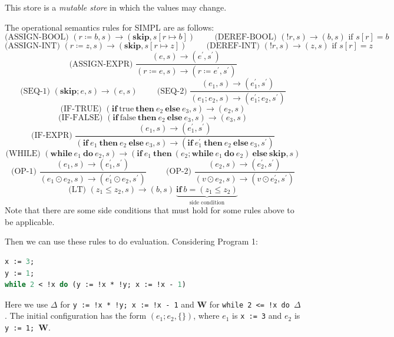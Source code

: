 This store is a \textit{mutable store} in which the values may change. 

The operational semantics rules for SIMPL are as follows:
\[
  \text{(ASSIGN-BOOL) } (r \coloneqq b, s) \to (\mathbf{skip}, s[r \mapsto b]) \hspace{1cm} \text{(DEREF-BOOL) } (!r, s) \to (b, s) \text{ if } s[r] = b
\]
\[
  \text{(ASSIGN-INT) } (r \coloneqq z, s) \to (\mathbf{skip}, s[r \mapsto z]) \hspace{1cm} \text{(DEREF-INT) } (!r, s) \to (z, s) \text{ if } s[r] = z
\]
\[
  \text{(ASSIGN-EXPR) } \dfrac{(e, s) \to (e^{\prime}, s^{\prime})}{(r \coloneqq e, s) \to (r \coloneqq e^{\prime}, s^{\prime})}
\]
\[
  \text{(SEQ-1) } (\mathbf{skip}; e, s) \to (e, s) \hspace{1cm} \text{(SEQ-2) } \dfrac{(e_1, s) \to (e_1^{\prime}, s^{\prime})}{(e_1; e_2, s) \to (e_1^{\prime}; e_2, s^{\prime})}
\]
\[
  \text{(IF-TRUE) } (\mathbf{if}\ \text{true}\ \mathbf{then}\ e_2\ \mathbf{else}\ e_3, s) \to (e_2, s)
\]
\[
  \text{(IF-FALSE) } (\mathbf{if}\ \text{false}\ \mathbf{then}\ e_2\ \mathbf{else}\ e_3, s) \to (e_3, s)
\]
\[
  \text{(IF-EXPR) } \dfrac{(e_1, s) \to (e_1^{\prime}, s^{\prime})}{(\mathbf{if}\ e_1\ \mathbf{then}\ e_2\ \mathbf{else}\ e_3, s) \to (\mathbf{if}\ e_1^{\prime}\ \mathbf{then}\ e_2\ \mathbf{else}\ e_3, s^{\prime})}
\]
\[
  \text{(WHILE) } (\mathbf{while}\ e_1\ \mathbf{do}\ e_2, s) \to (\mathbf{if}\ e_1\ \mathbf{then}\ (e_2; \mathbf{while}\ e_1\ \mathbf{do}\ e_2)\ \mathbf{else}\ \mathbf{skip}, s)
\]
\[
  \text{(OP-1) } \dfrac{(e_1, s) \to (e_1^{\prime}, s^{\prime})}{(e_1 \odot e_2, s) \to (e_1^{\prime} \odot e_2, s^{\prime})} \hspace{1cm} 
  \text{(OP-2) } \dfrac{(e_2, s) \to (e_2^{\prime}, s^{\prime})}{(v \odot e_2, s) \to (v \odot e_2^{\prime}, s^{\prime})}
\]
\[
  \text{(LT) } (z_1 \le z_2, s) \to (b, s)\ \underbrace{\mathbf{if}\ b = (z_1 \le z_2)}_{\text{side condition}}
\]
Note that there are some side conditions that must hold for some rules above to be applicable. 

Then we can use these rules to do evaluation. Considering Program 1:
\begin{lstlisting}[language=OCaml]
x := 3;
y := 1;
while 2 < !x do (y := !x * !y; x := !x - 1)
\end{lstlisting}

Here we use \(\Delta\) for \texttt{y := !x * !y; x := !x - 1} and \(\mathbf{W}\) for \texttt{while 2 <= !x do \(\Delta\)}. The initial configuration has the form \((e_1; e_2, \{\})\), where \(e_1\) is \texttt{x := 3} and \(e_2\) is \texttt{y := 1; \(\mathbf{W}\)}. 

